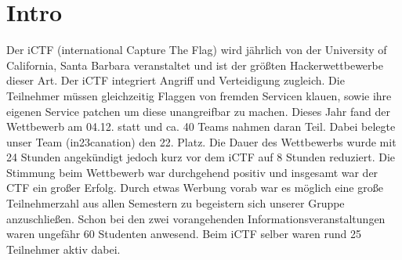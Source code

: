 \chapter{Intro}
Der iCTF (international Capture The Flag) wird jährlich von der University of California, Santa Barbara veranstaltet und ist der größten Hackerwettbewerbe dieser Art. 
Der iCTF integriert Angriff und Verteidigung zugleich. Die Teilnehmer müssen gleichzeitig Flaggen von fremden Servicen klauen, sowie ihre eigenen Service patchen um diese unangreifbar zu machen. 
Dieses Jahr fand der Wettbewerb am 04.12. statt und ca. 40 Teams nahmen daran Teil. Dabei belegte unser Team (in23canation) den 22. Platz. Die Dauer des Wettbewerbs wurde mit 24 Stunden angekündigt jedoch kurz vor dem iCTF auf 8 Stunden reduziert. 
Die Stimmung beim Wettbewerb war durchgehend positiv und insgesamt war der CTF ein großer Erfolg. Durch etwas Werbung vorab war es möglich eine große Teilnehmerzahl aus allen Semestern zu begeistern sich unserer Gruppe anzuschließen. Schon bei den zwei vorangehenden Informationsveranstaltungen waren ungefähr 60 Studenten anwesend. Beim iCTF selber waren rund 25 Teilnehmer aktiv dabei. 